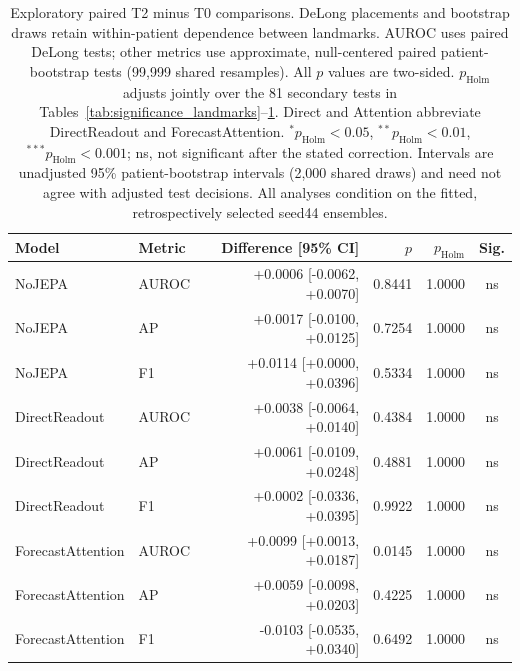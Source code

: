 \begin{table}[t]
\centering
\small
\caption{Exploratory paired T2 minus T0 comparisons. DeLong placements and bootstrap draws retain within-patient dependence between landmarks. AUROC uses paired DeLong tests; other metrics use approximate, null-centered paired patient-bootstrap tests (99,999 shared resamples). All $p$ values are two-sided. $p_{\mathrm{Holm}}$ adjusts jointly over the 81 secondary tests in Tables~\ref{tab:significance_landmarks}--\ref{tab:significance_longitudinal}. Direct and Attention abbreviate DirectReadout and ForecastAttention. $^{*}p_{\mathrm{Holm}}<0.05$, $^{**}p_{\mathrm{Holm}}<0.01$, $^{***}p_{\mathrm{Holm}}<0.001$; ns, not significant after the stated correction. Intervals are unadjusted 95\% patient-bootstrap intervals (2,000 shared draws) and need not agree with adjusted test decisions. All analyses condition on the fitted, retrospectively selected seed44 ensembles.}
\label{tab:significance_longitudinal}
\begin{tabular}{llrrrc}
\toprule
Model & Metric & Difference [95\% CI] & $p$ & $p_{\mathrm{Holm}}$ & Sig. \\
\midrule
NoJEPA & AUROC & +0.0006 [-0.0062, +0.0070] & 0.8441 & 1.0000 & ns \\
NoJEPA & AP & +0.0017 [-0.0100, +0.0125] & 0.7254 & 1.0000 & ns \\
NoJEPA & F1 & +0.0114 [+0.0000, +0.0396] & 0.5334 & 1.0000 & ns \\
DirectReadout & AUROC & +0.0038 [-0.0064, +0.0140] & 0.4384 & 1.0000 & ns \\
DirectReadout & AP & +0.0061 [-0.0109, +0.0248] & 0.4881 & 1.0000 & ns \\
DirectReadout & F1 & +0.0002 [-0.0336, +0.0395] & 0.9922 & 1.0000 & ns \\
ForecastAttention & AUROC & +0.0099 [+0.0013, +0.0187] & 0.0145 & 1.0000 & ns \\
ForecastAttention & AP & +0.0059 [-0.0098, +0.0203] & 0.4225 & 1.0000 & ns \\
ForecastAttention & F1 & -0.0103 [-0.0535, +0.0340] & 0.6492 & 1.0000 & ns \\
\bottomrule
\end{tabular}
\end{table}
